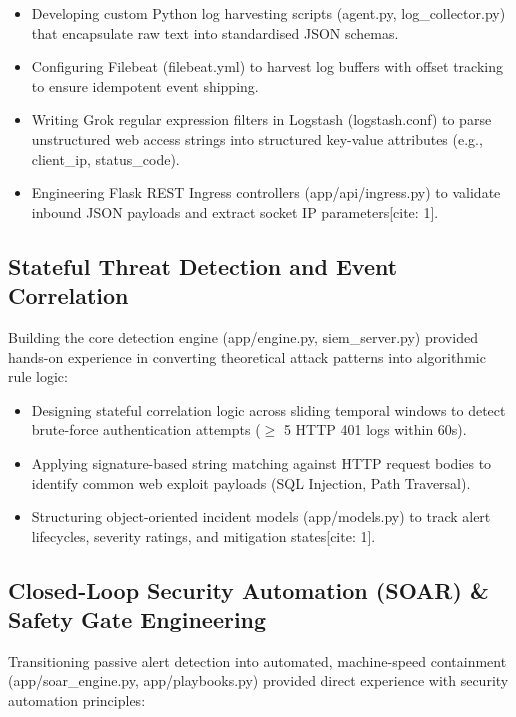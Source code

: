 \begin{itemize}
  \item Developing custom Python log harvesting scripts (agent.py, log\_collector.py) that encapsulate raw text into standardised JSON schemas.
  \item Configuring Filebeat (filebeat.yml) to harvest log buffers with offset tracking to ensure idempotent event shipping.
  \item Writing Grok regular expression filters in Logstash (logstash.conf) to parse unstructured web access strings into structured key-value attributes (e.g., client\_ip, status\_code).
  \item Engineering Flask REST Ingress controllers (app/api/ingress.py) to validate inbound JSON payloads and extract socket IP parameters[cite: 1].
\end{itemize}

\subsection{Stateful Threat Detection and Event Correlation}

Building the core detection engine (app/engine.py, siem\_server.py) provided hands-on experience in converting theoretical attack patterns into algorithmic rule logic:

\begin{itemize}
  \item Designing stateful correlation logic across sliding temporal windows to detect brute-force authentication attempts ($\ge$ 5 HTTP 401 logs within 60s).
  \item Applying signature-based string matching against HTTP request bodies to identify common web exploit payloads (SQL Injection, Path Traversal).
  \item Structuring object-oriented incident models (app/models.py) to track alert lifecycles, severity ratings, and mitigation states[cite: 1].
\end{itemize}

\subsection{Closed-Loop Security Automation (SOAR) \& Safety Gate Engineering}

Transitioning passive alert detection into automated, machine-speed containment (app/soar\_engine.py, app/playbooks.py) provided direct experience with security automation principles:

